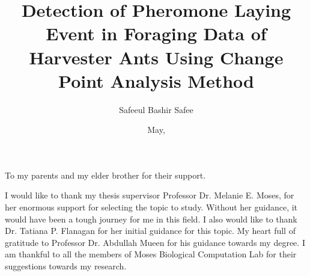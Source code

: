 \documentclass[botnum, fleqn]{unmeethesis}
\begin{document}
\frontmatter




\title{Detection of Pheromone Laying Event in Foraging Data of Harvester Ants Using Change Point Analysis Method}

\author{Safeeul Bashir Safee}





\date{May, \thisyear}
\maketitle


\begin{dedication}
   To my parents and my elder brother for their support. \\[3ex]
\end{dedication}

\begin{acknowledgments}
   \vspace{1.1in}
  I would like to thank my thesis supervisor Professor Dr. Melanie E. Moses, for her enormous support for selecting the topic to study. Without her guidance, it would have been a tough journey for me in this field. I also would like to thank Dr. Tatiana P. Flanagan for her initial guidance for this topic. My heart full of gratitude to Professor Dr. Abdullah Mueen for his guidance towards my degree. 
  I am thankful to all the members of Moses Biological Computation Lab for their suggestions towards my research. 
\end{acknowledgments}

\maketitleabstract %
\end{document}
